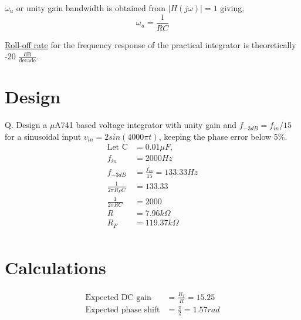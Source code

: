 \documentclass[12pt, titlepage]{article}
\theoremstyle{definition}
\begin{document}
    \underline{$\omega_u$} or unity gain bandwidth is obtained from $|H(j\omega)| = 1$ giving,
    \begin{equation}\label{eq:unity_gain_bw}
      \omega_u = \frac{1}{RC}
    \end{equation}

    \underline{Roll-off rate} for the frequency response of the practical integrator is theoretically -20 $\frac{\text{dB}}{\text{decade}}$.

  \newpage
  \section{Design}
    Q. Design a $\mu$A741 based voltage integrator with unity gain and
    $f_{-3dB} = f_{in}/15$ for a sinusoidal input
    $v_{in} = 2 sin(4000\pi t)$, keeping the phase error below 5\%.
    \begin{align*}
        \text{Let C} \! &=0.01\mu F , \\
        f_{in} &=2000 Hz\\
        f_{-3dB} &=\frac{f_{in}}{15} = 133.33 Hz \\
        \frac{1}{2\pi R_{F}C} &= 133.33\\
        \frac{1}{2\pi RC} &= 2000\\
        R &=7.96k\Omega\\
        R_{F} &=119.37k\Omega\\
    \end{align*}


  \section{Calculations}
  \begin{align*}
    \text{Expected DC gain} &= \frac{R_{f}}{R}=15.25\\
    \text{Expected phase shift} &= \frac{\pi}{2}=1.57 rad
  \end{align*}


  \newpage
\end{document}
